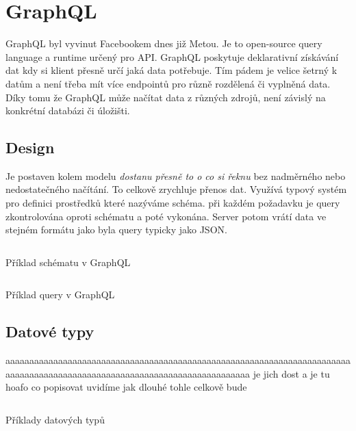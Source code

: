 \section{GraphQL}
GraphQL byl vyvinut Facebookem dnes již Metou. Je to open-source query language a runtime určený pro API. GraphQL poskytuje deklarativní získávání dat kdy si klient přesně určí jaká data potřebuje. Tím pádem je velice šetrný k datům a není třeba mít více endpointů pro různě rozdělená či vyplněná data. Díky tomu že GraphQL může načítat data z různých zdrojů, není závislý na konkrétní databázi či úložišti.

\subsection{Design}
Je postaven kolem modelu \textit{dostanu přesně to o co si řeknu} bez nadměrného nebo nedostatečného načítání. To celkově zrychluje přenos dat. Využívá typový systém pro definici prostředků které nazýváme schéma. při každém požadavku je query zkontrolována oproti schématu a poté vykonána. Server potom vrátí data ve stejném formátu jako byla query typicky jako JSON.

\begin{listing}[ht!]
    \inputminted[]{ts}{resources/code/standards/playertype.gql}
    \caption{Příklad schématu v GraphQL}
    \label{code:gql_type}
\end{listing}

\begin{listing}[ht!]
    \inputminted[]{graphql}{resources/code//standards/playerquery.gql}
    \caption{Příklad query v GraphQL}
    \label{code:gql_querry}
\end{listing}

\subsection{Datové typy}
aaaaaaaaaaaaaaaaaaaaaaaaaaaaaaaaaaaaaaaaaaaaaaaaaaaaaaaaaaaaaaaaaaaaaaaaaaaaaaaaaaaaaaaaaaaaaaaaaaaaaaaaaaaaaaaaaaaaaaaaaaa
je jich dost a je tu hoafo co popisovat uvidíme jak dlouhé tohle celkově bude


\begin{listing}[ht]
    \inputminted[]{graphql}{resources/code/standards/types.example.gql}
    \caption{Příklady datových typů}
    \label{code:gql_datatypes}
\end{listing}

